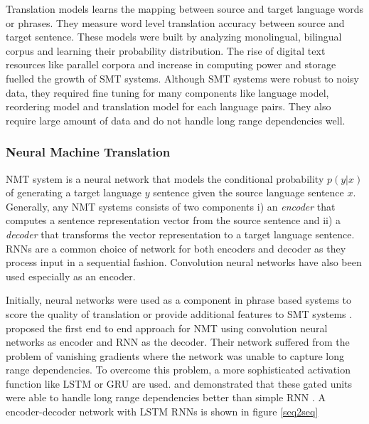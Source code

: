 Translation models learns the mapping between source and target language words or phrases. They measure word level translation accuracy between source and target sentence. These models were built by analyzing  monolingual, bilingual corpus and learning their probability distribution. The rise of digital text resources like parallel corpora and increase in computing power and storage fuelled the growth of SMT systems. Although SMT systems were robust to noisy data,  they required fine tuning for many components like language model, reordering model and translation model for each language pairs. They also require large amount of data and do not handle long range dependencies well.


\subsubsection{Neural Machine Translation}

NMT system is a neural network that models the conditional probability $p(y|x)$ of generating a target language $y$ sentence given the source language sentence $x$. Generally, any NMT systems consists of two components i) an \textit{encoder} that computes a sentence representation vector from the source sentence and ii) a \textit{decoder} that transforms the vector representation to a target language sentence. RNNs are a common choice of network for both encoders and decoder as they process input in a sequential fashion. Convolution neural networks have also been used especially as an encoder.


Initially, neural networks were used as a component in phrase based systems to score the quality of translation \citep{schwenk2012continuous} or provide additional features to SMT systems \citep{zou2013bilingual}. \cite{kalchbrenner2013recurrent} proposed the first end to end approach for NMT using convolution neural networks as encoder and RNN as the decoder. Their network suffered from the problem of vanishing gradients where the network was unable to capture long range dependencies. To overcome this problem, a more sophisticated activation function like LSTM \citep{hochreiter1997long} or GRU \citep{cho2014learning} are used.  \cite{sutskever2014sequence} and \cite{cho2014learning} demonstrated that these gated units were able to handle long range dependencies better than simple RNN \citep{elman1990finding}. A encoder-decoder network with LSTM RNNs \citep{sutskever2014sequence} is shown in figure \ref{seq2seq}

